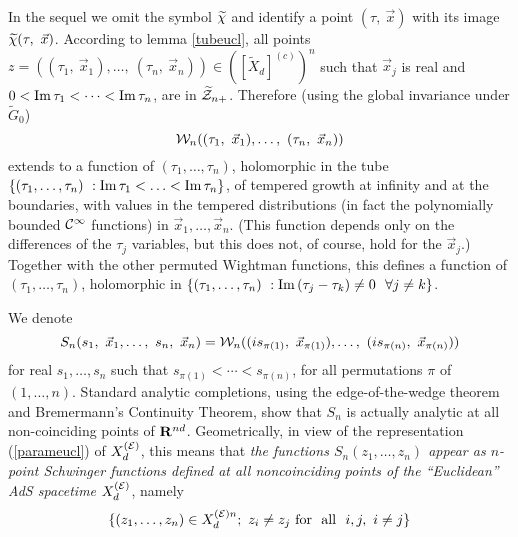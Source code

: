 \documentclass[a4paper,a4paper]{article}
\def\bR{{\bf R}}
\def\Im{{\rm Im\,}}
\def\CC{{\cal C}}
\def\EE{{\cal E}}
\def\WW{{\cal W}}
\def\ZZ{{\cal Z}}
\def\wt{\widetilde}
\begin{document}
In the sequel we omit the symbol $\param$ and identify
a point $(\tau,\ \vec{x})$ with its image $\param(\tau,\ \vec{x})$.
According to lemma \ref{tubeucl}, all points
$z = ((\tau_1,\ \vec{x}_1),\ldots,\ (\tau_n,\ \vec{x}_n)) \in
\left( [\wt X_d]^{(c)}\right)^n$
such that $\vec{x}_j$ is real and
$0 < \Im \tau_1 < \cdots <  \Im \tau_n$, are in $\wt\ZZ_{n+}$.
Therefore (using the global invariance under $\wt G_0$)
\begin{equation}
\WW_n((\tau_1,\ \vec{x}_1),\ldots,\ (\tau_n,\ \vec{x}_n))
\label{7.3}\end{equation}
extends to a function of $(\tau_1,\ldots,\tau_n)$, holomorphic
in the tube
$\{(\tau_1,\ldots,\tau_n)\ : \Im \tau_1 < \ldots < \Im \tau_n\}$,
of tempered growth at infinity and at the boundaries, with values in
the tempered distributions (in fact the polynomially bounded
$\CC^\infty$ functions) in $\vec{x}_1,\ldots,\vec{x}_n$. (This function
depends only on the differences of the $\tau_j$ variables, but
this does not, of course, hold for the $\vec{x}_j$.)
Together with the other permuted Wightman functions, this defines
a function of $(\tau_1,\ldots,\tau_n)$, holomorphic in
$\{(\tau_1,\ldots,\tau_n)\ : \Im (\tau_j -\tau_k) \not= 0 \ \
\forall j \not= k\}$.

We denote
\begin{equation}
S_n(s_1,\ \vec{x}_1,\ldots,\ s_n,\ \vec{x}_n) =
\WW_n((is_{\pi(1)},\ \vec{x}_{\pi(1)}),\ldots,\
(is_{\pi(n)},\ \vec{x}_{\pi(n)}))
\label{7.4}\end{equation}
for real $s_1,\ldots,s_n$ such that $s_{\pi(1)} < \cdots < s_{\pi(n)}$,
for all permutations $\pi$ of $(1,\ldots,n)$.
Standard analytic completions, using the edge-of-the-wedge theorem
and Bremermann's Continuity Theorem, show that $S_n$ is actually analytic
at all non-coinciding points of $\bR^{nd}$.
Geometrically, in view of the representation (\ref{parameucl})
of $X_d^{(\EE)}$, this means that
{\sl the functions $S_n(z_1,\ldots,z_n)$ appear
as $n$-point Schwinger functions defined at all
noncoinciding points of the ``Euclidean'' AdS spacetime
$X_d^{(\EE)}$},
namely
\begin{equation}
\{(z_1,\ldots,z_n) \in X_d^{(\EE) n};\ z_i \neq z_j
\ {\rm for }\ \ {\rm all} \ \  i,j,\   i\neq j\}
\label{noncoinc}\end{equation}
\end{document}
